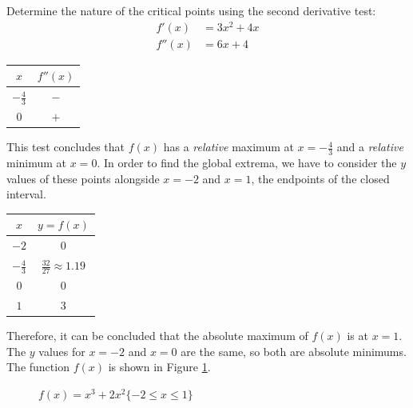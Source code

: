 \documentclass[12pt]{article}
\begin{document}
\noindent Determine the nature of the critical points using the second derivative test:
\begin{align*}
	f'(x) &= 3x^2 + 4x \\
	f''(x) &= 6x + 4
\end{align*}
\begin{table}[H]
	\centering
	\begin{tabular}{|c|c|}
		\hline
		$x$ & $f''(x)$ \\
		\hline \hline
		$-\frac{4}{3}$ & $-$ \\
		\hline
		$0$ & $+$ \\
		\hline
	\end{tabular}
\end{table}

\noindent This test concludes that $f(x)$ has a \textit{relative} maximum at $x = -\frac{4}{3}$ and a \textit{relative} minimum at $x = 0$. In order to find the global extrema, we have to consider the $y$ values of these points alongside $x = -2$ and $x = 1$, the endpoints of the closed interval.
\begin{table}[H]
	\centering
	\begin{tabular}{|c|c|}
		\hline
		$x$ & $y = f(x)$ \\
		\hline \hline
		$-2$ & $0$ \\
		\hline
		$-\frac{4}{3}$ & $\frac{32}{27} \approx 1.19$ \\
		\hline
		$0$ & $0$ \\
		\hline
		$1$ & $3$ \\
		\hline
	\end{tabular}
\end{table}

\noindent Therefore, it can be concluded that the absolute maximum of $f(x)$ is at $x = 1$. The $y$ values for $x = -2$ and $x = 0$ are the same, so both are absolute minimums. The function $f(x)$ is shown in Figure \ref{fig:global_extrema}.
\begin{figure}[H]
	\centering
	\caption{$f(x) = x^3 + 2x^2 \{ -2 \leq x \leq 1 \}$}
	\label{fig:global_extrema}
\end{figure}
\end{document}
